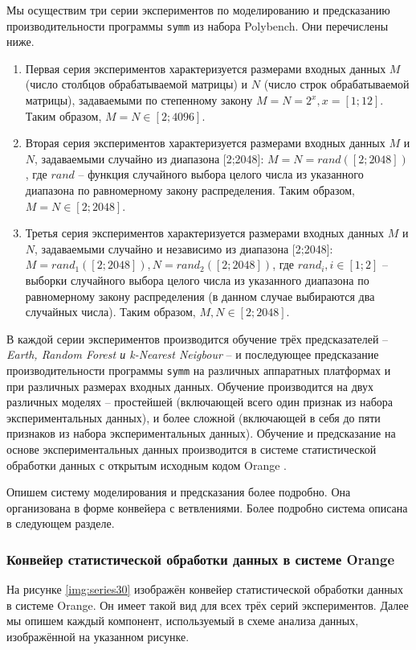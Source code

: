 Мы осуществим три серии экспериментов по моделированию и предсказанию производительности программы \texttt{symm} из набора Polybench. Они перечислены ниже.
\begin{enumerate}
    \item Первая серия экспериментов характеризуется размерами входных данных $M$ (число столбцов обрабатываемой матрицы) и $N$ (число строк обрабатываемой матрицы), задаваемыми по степенному закону $M = N = 2^x, x = [1;12]$. Таким образом, $M = N \in [2;4096]$.
    \item Вторая серия экспериментов характеризуется размерами входных данных $M$ и $N$, задаваемыми случайно из диапазона [2;2048]: $M = N = rand([2;2048])$, где $rand$ -- функция случайного выбора целого числа из указанного диапазона по равномерному закону распределения. Таким образом, $M = N \in [2;2048]$.
    \item Третья серия экспериментов характеризуется размерами входных данных $M$ и $N$, задаваемыми случайно и независимо из диапазона [2;2048]: $M = rand_1([2;2048]), N = rand_2([2;2048])$, где $rand_i, i \in [1;2]$ -- выборки случайного выбора целого числа из указанного диапазона по равномерному закону распределения (в данном случае выбираются два случайных числа). Таким образом, $M, N \in [2;2048]$.
\end{enumerate}

В каждой серии экспериментов производится обучение трёх предсказателей -- \textit{Earth, Random Forest и k-Nearest Neigbour} -- и последующее предсказание производительности программы \texttt{symm} на различных аппаратных платформах и при различных размерах входных данных. Обучение производится на двух различных моделях -- простейшей (включающей всего один признак из набора экспериментальных данных), и более сложной (включающей в себя до пяти признаков из набора экспериментальных данных). Обучение и предсказание на основе экспериментальных данных производится в системе статистической обработки данных с открытым исходным кодом Orange \cite{orange}.

Опишем систему моделирования и предсказания более подробно. Она организована в форме конвейера с ветвлениями. Более подробно система описана в следующем разделе.

\subsubsection{Конвейер статистической обработки данных в системе Orange}
На рисунке \ref{img:series30} изображён конвейер статистической обработки данных в системе Orange. Он имеет такой вид для всех трёх серий экспериментов. Далее мы опишем каждый компонент, используемый в схеме анализа данных, изображённой на указанном рисунке.

